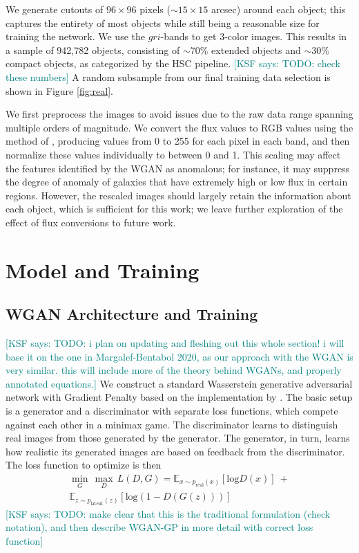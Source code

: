 \documentclass[fleqn,usenatbib,useAMS]{mnras}
\newcommand{\KSF}[1]{\textcolor{teal}{{[KSF says: #1]}}}
\DeclareMathOperator*{\maxi}{max}
\DeclareMathOperator*{\mini}{min}
\begin{document}
We generate cutouts of $96 \times 96$ pixels ($\sim15\times 15$ arcsec) around each object; this captures the entirety of most objects while still being a reasonable size for training the network.
We use the $gri$-bands to get 3-color images.
This results in a sample of 942,782 objects, consisting of $\sim$70\% extended objects and $\sim$30\% compact objects, as categorized by the HSC pipeline. \KSF{TODO: check these numbers}
A random subsample from our final training data selection is shown in Figure \ref{fig:real}.

We first preprocess the images to avoid issues due to the raw data range spanning multiple orders of magnitude.
We convert the flux values to RGB values using the method of \citealt{Lupton2004}, producing values from 0 to 255 for each pixel in each band, and then normalize these values individually to between 0 and 1.
This scaling may affect the features identified by the WGAN as anomalous; for instance, it may suppress the degree of anomaly of galaxies that have extremely high or low flux in certain regions.
However, the rescaled images should largely retain the information about each object, which is sufficient for this work; we leave further exploration of the effect of flux conversions to future work.

\section{Model and Training}
\label{sec:model}

\subsection{WGAN Architecture and Training}

\KSF{TODO: i plan on updating and fleshing out this whole section! i will base it on the one in Margalef-Bentabol 2020, as our approach with the WGAN is very similar. this will include more of the theory behind WGANs, and properly annotated equations.}
We construct a standard Wasserstein generative adversarial network with Gradient Penalty based on the implementation by \cite{Gulrajani2017}.
The basic setup is a generator and a discriminator with separate loss functions, which compete against each other in a minimax game.
The discriminator learns to distinguish real images from those generated by the generator.
The generator, in turn, learns how realistic its generated images are based on feedback from the discriminator.
The loss function to optimize is then
\begin{multline}
\mini_G \, \maxi_D \, L(D,G) = \mathbb{E}_{x\sim p_{\mathrm{real}}(x)}[\mathrm{log} D(x)] \: + \\ \mathbb{E}_{z\sim p_{\mathrm{latent}}(z)}[\mathrm{log}(1 - D(G(z)))] 
\end{multline}
\KSF{TODO: make clear that this is the traditional formulation (check notation), and then describe WGAN-GP in more detail with correct loss function}
\end{document}
